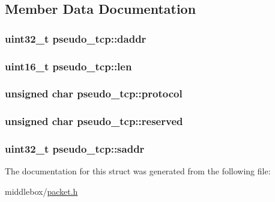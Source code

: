 \subsection{Member Data Documentation}
\hypertarget{structpseudo__tcp_a06460250f9953c76b2fadbddf9164e16}{
\subsubsection[{daddr}]{\setlength{\rightskip}{0pt plus 5cm}uint32\-\_\-t pseudo\-\_\-tcp\-::daddr}}\label{structpseudo__tcp_a06460250f9953c76b2fadbddf9164e16}
\hypertarget{structpseudo__tcp_a6eaab74d426119b254099bb7616d2e61}{
\subsubsection[{len}]{\setlength{\rightskip}{0pt plus 5cm}uint16\-\_\-t pseudo\-\_\-tcp\-::len}}\label{structpseudo__tcp_a6eaab74d426119b254099bb7616d2e61}
\hypertarget{structpseudo__tcp_a14eb816e33e077b9cc1db31cb1e382ca}{
\subsubsection[{protocol}]{\setlength{\rightskip}{0pt plus 5cm}unsigned char pseudo\-\_\-tcp\-::protocol}}\label{structpseudo__tcp_a14eb816e33e077b9cc1db31cb1e382ca}
\hypertarget{structpseudo__tcp_a1ffb91e2c0f6b4ae0921c54dc6a9d3fd}{
\subsubsection[{reserved}]{\setlength{\rightskip}{0pt plus 5cm}unsigned char pseudo\-\_\-tcp\-::reserved}}\label{structpseudo__tcp_a1ffb91e2c0f6b4ae0921c54dc6a9d3fd}
\hypertarget{structpseudo__tcp_af36926d74005032f8a55cdc9e7d3c456}{
\subsubsection[{saddr}]{\setlength{\rightskip}{0pt plus 5cm}uint32\-\_\-t pseudo\-\_\-tcp\-::saddr}}\label{structpseudo__tcp_af36926d74005032f8a55cdc9e7d3c456}


The documentation for this struct was generated from the following file\-:\begin{DoxyCompactItemize}
\item 
middlebox/\hyperlink{packet_8h}{packet.\-h}\end{DoxyCompactItemize}
